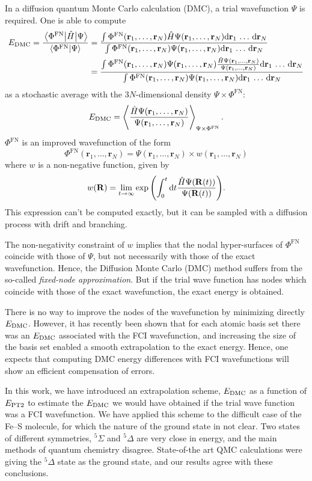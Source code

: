 \documentclass[./thesis.tex]{subfiles}
\begin{document}
\newcommand{\rn}{\mathbf{r}_1,\dots,\mathbf{r}_N}
\newcommand{\drn}{\text{d}\mathbf{r}_1\,\dots\,\text{d}\mathbf{r}_N}
In a diffusion quantum Monte Carlo calculation (DMC), a trial wavefunction
$\Psi$ is required. One is able to compute
\begin{align}
  \EDMC = \frac{\Hij{\Phi^{\text{FN}}}{\Psi}}{\braket{\Phi^{\text{FN}}}{\Psi}} & = 
  \frac{\int \Phi^{\text{FN}}(\rn) {\hat H}\Psi(\rn) \drn}{\int \Phi^{\text{FN}}(\rn)\Psi(\rn) \drn} \\
  & = \frac{\int \Phi^{\text{FN}}(\rn)\Psi(\rn) \frac{{\hat H}\Psi(\rn)}{\Psi(\rn)} \drn}{\int \Phi^{\text{FN}}(\rn)\Psi(\rn) \drn} 
\end{align}
as a stochastic average with the $3N$-dimensional density $\Psi \times \Phi^{\text{FN}}$:
\begin{equation}
  \EDMC = \left \langle \frac{{\hat H}\Psi(\rn)}{\Psi(\rn)} \right \rangle_{\Psi \times \Phi^{\text{FN}}}.
\end{equation}
$\Phi^{\text{FN}}$ is an improved wavefunction of the form
\begin{equation}
\Phi^{\text{FN}}(\rn)  = \Psi(\rn) \times w (\rn)
\end{equation}
where $w$ is a non-negative function, given by
\begin{equation}
w(\mathbf{R}) = \lim_{t \rightarrow \infty} \exp \qty( \int_0^t \text{d}t \frac{{\hat H}\Psi(\mathbf{R}(t))}{\Psi(\mathbf{R}(t))} ).
\end{equation}
This expression can't be computed exactly, but it can be sampled with a diffusion
process with drift and branching.\cite{Hammond_1994}

The non-negativity constraint of $w$ implies that the nodal
hyper-surfaces of $\Phi^{\text{FN}}$ coincide with those of $\Psi$, but not necessarily with
those of the exact wavefunction. Hence, the Diffusion Monte Carlo (DMC) method
suffers from the so-called \emph{fixed-node approximation}. But if the trial wave
function has nodes which coincide with those of the exact wavefunction, the
exact energy is obtained.

There is no way to improve the nodes of the wavefunction by minimizing directly $E_\text{DMC}$.
However, it has recently been shown\cite{Caffarel_2016} that for each atomic basis
set there was an $E_\text{DMC}$ associated with the FCI wavefunction, and increasing the
size of the basis set enabled a smooth extrapolation to the exact energy.
Hence, one expects that computing DMC energy differences with FCI wavefunctions will
show an efficient compensation of errors.

In this work, we have introduced an extrapolation scheme, $E_\text{DMC}$ as a function
of $E_\text{PT2}$ to estimate the $E_\text{DMC}$ we would have obtained if the trial wave
function was a FCI wavefunction. We have applied this scheme to the difficult
case of the Fe--S molecule, for which the nature of the ground state in not
clear. Two states of different symmetries, $^5\Sigma$ and $^5\Delta$ are very
close in energy, and the main methods of quantum chemistry disagree.
State-of-the art QMC calculations were giving the $^5\Delta$ state
as the ground state,\cite{Haghighi_Mood_2017} and our results agree with these
conclusions.



\end{document}
